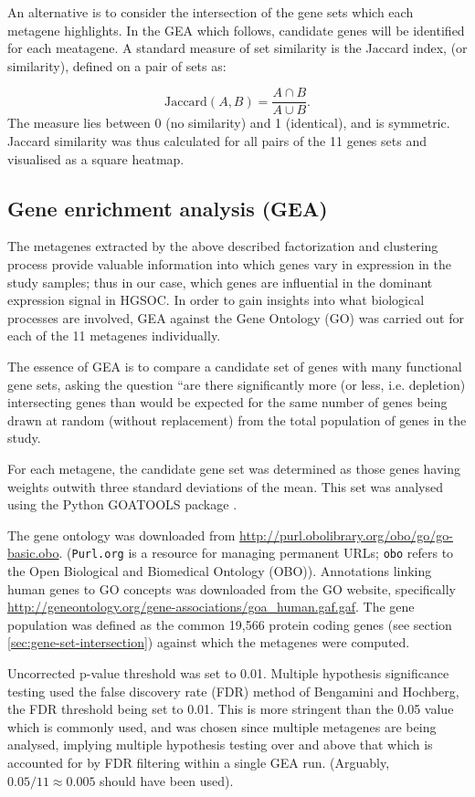 \documentclass[tikz, 12pt,a4paper,oneside,fleqn]{article}
\begin{document}
An alternative is to consider the intersection of the gene sets which each metagene highlights.  In the GEA which follows, candidate genes will be identified for each meatagene.  A standard measure of set similarity is the Jaccard index, (or similarity), defined on a pair of sets as:

\[
   \mbox{Jaccard}(A, B) = \frac{A \cap B}{A \cup B}.
\]
The measure lies between 0 (no similarity) and 1 (identical), and is symmetric.  Jaccard similarity was thus calculated for all pairs of the 11 genes sets and visualised as a square heatmap.
	   	  
\subsection{Gene enrichment analysis (GEA)}
\label{sec-gea}
The metagenes extracted by the above described factorization and clustering process provide valuable information into which genes vary in expression in the study samples; thus in our case, which genes are influential in the dominant expression signal in HGSOC.  
In order to gain insights into what biological processes are involved, GEA against the Gene Ontology (GO) was carried out for each of the 11 metagenes individually.

The essence of GEA is to compare a candidate set of genes with many functional gene sets, asking the question ``are there significantly more (or less, i.e. depletion) intersecting genes than would be expected for the same number of genes being drawn at random (without replacement) from the total population of genes in the study. 

For each metagene, the candidate gene set was determined as those genes having weights outwith three standard deviations of the mean.   This set was analysed using the Python GOATOOLS package \cite{Klopfenstein2018}.   

The gene ontology was downloaded from \url{http://purl.obolibrary.org/obo/go/go-basic.obo}.  ({\tt Purl.org} is a resource for managing permanent URLs; {\tt obo} refers to the Open Biological and Biomedical Ontology (OBO)).  
Annotations linking human genes to GO concepts was downloaded from the GO website, specifically \url{http://geneontology.org/gene-associations/goa_human.gaf.gaf}.   
The gene population was defined as the common 19,566 protein coding genes (see section \ref{sec:gene-set-intersection}) against which the metagenes were computed.  

Uncorrected p-value threshold was set to 0.01.
Multiple hypothesis significance testing used the false discovery rate (FDR) method of Bengamini and Hochberg, the FDR threshold being set to 0.01.  This is more stringent than the 0.05 value which is commonly used, and was chosen since multiple metagenes are being analysed, implying multiple hypothesis testing over and above that which is accounted for by FDR filtering within a single GEA run.  (Arguably, $0.05 / 11 \approx 0.005$ should have been used).
\end{document}
